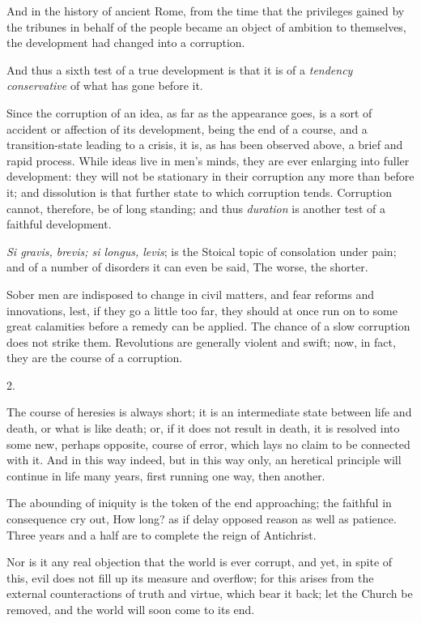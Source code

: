 And in the history of ancient Rome, from the time that
the privileges gained by the tribunes in behalf of the
people became an object of ambition to themselves, the
development had changed into a corruption.

And thus a sixth test of a true development is that it
is of a \emph{tendency conservative} of what has gone
before it.


Since the corruption of an idea, as far as the
appearance goes, is a sort of accident or affection of
its development, being the end of a course, and a
transition-state leading to a crisis, it is, as has been
observed above, a brief and rapid process. While ideas
live in men's minds, they are ever enlarging into fuller
development: they will not be stationary in their
corruption any more than before it; and dissolution is
that further state to which corruption tends. Corruption
cannot, therefore, be of long standing; and thus \emph{duration}
is another test of a faithful development.

\emph{Si gravis, brevis; si longus, levis}; is the
Stoical topic of consolation under pain; and of a number
of disorders it can even be said, The worse, the shorter.

Sober men are indisposed to change in civil matters,
and fear reforms and innovations, lest, if they go a
little too far, they should at once run on to some great
calamities before a remedy can be applied. The chance of
a slow corruption does not strike them. Revolutions are
generally violent and swift; now, in fact, they are the
course of a corruption.

2.

The course of heresies is always short; it is an
intermediate state between life and death, or what is
like death; or, if it does not result in death, it is
resolved into some new, perhaps opposite, course of
error, which lays no claim to be connected with it. And
in this way indeed, but in this way only, an heretical
principle will continue in life many years, first running
one way, then another.

The abounding of iniquity is the token of the end
approaching; the faithful in consequence cry out, How
long? as if delay opposed reason as well as patience.
Three years and a half are to complete the reign of Antichrist.

Nor is it any real objection that the world is ever
corrupt, and yet, in spite of this, evil does not fill up
its measure and overflow; for this arises from the
external counteractions of truth and virtue, which bear
it back; let the Church be removed, and the world will
soon come to its end.

